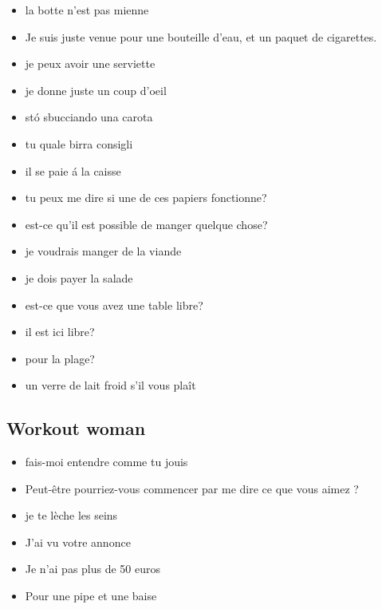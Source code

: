 \begin{itemize}
\item la botte n'est pas mienne

\item Je suis juste venue pour une bouteille d'eau, et un paquet de cigarettes.

\item je peux avoir une serviette

\item je donne juste un coup d'oeil

\item st\'o sbucciando una carota

\item tu quale birra consigli

\item il se paie \'a la caisse

\item tu peux me dire si une de ces papiers fonctionne?

\item est-ce qu'il est possible de manger quelque chose?

\item je voudrais manger de la viande

\item je dois payer la salade

\item est-ce que vous avez une table libre?

\item il est ici libre?

\item pour la plage?

\item un verre de lait froid s'il vous pla\^it

\end{itemize}


\subsection{Workout woman}

\begin{itemize}

\item fais-moi entendre comme tu jouis

\item Peut-\^etre pourriez-vous commencer par me dire ce que vous aimez ?

\item je te l\`eche les seins

\item J'ai vu votre annonce

\item Je n'ai pas plus de 50 euros

\item Pour une pipe et une baise

\end{itemize}

